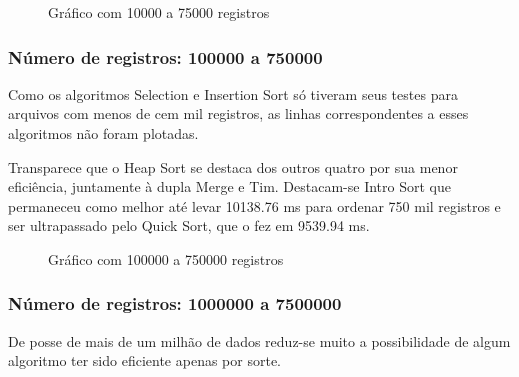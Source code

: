 \documentclass[a4paper,12pt]{scrartcl}
\begin{document}
\begin{figure}[H]
    \centering
    
    \caption{Gráfico com 10000 a 75000 registros}
    \label{mapaSelect}
\end{figure}

\subsubsection{Número de registros: 100000 a 750000}

Como os algoritmos Selection e Insertion Sort só tiveram seus testes para arquivos com menos de cem mil registros, as linhas correspondentes a esses algoritmos não foram plotadas.

Transparece que o Heap Sort se destaca dos outros quatro por sua menor eficiência, juntamente à dupla Merge e Tim. Destacam-se Intro Sort que permaneceu como melhor até levar 10138.76 ms para ordenar 750 mil registros e ser ultrapassado pelo Quick Sort, que o fez em 9539.94 ms.

\begin{figure}[H]
    \centering
    
    \caption{Gráfico com 100000 a 750000 registros}
    \label{mapaSelect}
\end{figure}

\subsubsection{Número de registros: 1000000 a 7500000}

De posse de mais de um milhão de dados reduz-se muito a possibilidade de algum algoritmo ter sido eficiente apenas por sorte.
\end{document}
